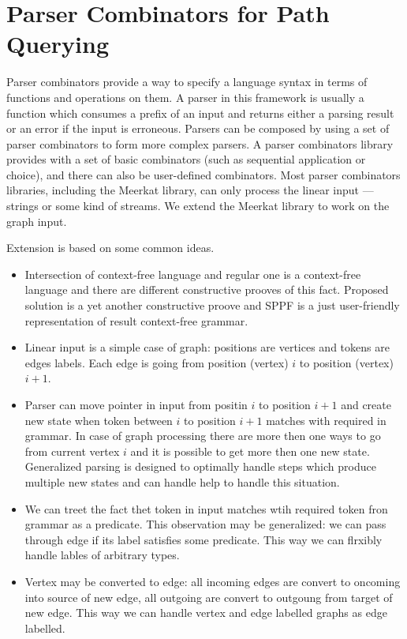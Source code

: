 \section{Parser Combinators for Path Querying}

Parser combinators provide a way to specify a language syntax in terms of functions and operations on them. 
A parser in this framework is usually a function which consumes a prefix of an input and returns either a parsing result or an error if the input is erroneous. 
Parsers can be composed by using a set of parser combinators to form more complex parsers. 
A parser combinators library provides with a set of basic combinators (such as sequential application or choice), and there can also be user-defined combinators. 
Most parser combinators libraries, including the Meerkat library, can only process the linear input --- strings or some kind of streams. 
We extend the Meerkat library to work on the graph input.

Extension is based on some common ideas.
\begin{itemize}
\item Intersection of context-free language and regular one is a context-free language and there are different constructive prooves of this fact.
Proposed solution is a yet another constructive proove and SPPF is a just user-friendly representation of result context-free grammar.
\item Linear input is a simple case of graph: positions are vertices and tokens are edges labels.
Each edge is going from position (vertex) $i$ to position (vertex) $i+1$.
\item Parser can move pointer in input from positin $i$ to position $i+1$ and create new state when token between $i$ to position $i+1$ matches with required in grammar.
In case of graph processing there are more then one ways to go from current vertex $i$ and it is possible to get more then one new state.
Generalized parsing is designed to optimally handle steps which produce multiple new states and can handle help to handle this situation.
\item We can treet the fact thet token in input matches wtih required token fron grammar as a predicate.
This observation may be generalized: we can pass through  edge if its label satisfies some predicate.
This way we can flrxibly handle lables of arbitrary types.
\item Vertex may be converted to edge: all incoming edges are convert to oncoming into source of new edge, all outgoing are convert to outgoung from target of new edge.
This way we can handle vertex and edge labelled graphs as edge labelled.
\end{itemize}


